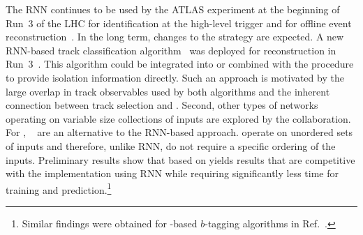 The RNN \tauid continues to be used by the ATLAS experiment at the beginning of
Run~3 of the LHC for identification at the high-level trigger and for offline
event reconstruction~\cite{ATL-PHYS-PUB-2022-044}. In the long term, changes to
the \tauid strategy are expected. A new RNN-based \tauhadvis track
classification algorithm~\cite{Maerker:2021hro} was deployed for \tauhadvis
reconstruction in Run~3~\cite{ATL-PHYS-PUB-2022-044}. This algorithm could be
integrated into or combined with the \tauid procedure to provide isolation
information directly. Such an approach is motivated by the large overlap in
track observables used by both algorithms and the inherent connection between
\tauhadvis track selection and \tauid. Second, other types of networks operating
on variable size collections of inputs are explored by the collaboration. For
\tauid, \deepsets~\cite{NIPS2017_f22e4747} are an alternative to the RNN-based
approach. \deepsets operate on unordered sets of inputs and therefore, unlike
RNN, do not require a specific ordering of the inputs. Preliminary results show
that \tauid based on \deepsets yields results that are competitive with the
implementation using RNN while requiring significantly less time for training
and prediction.\footnote{Similar findings were obtained for \deepsets-based
  $b$-tagging algorithms in Ref.~\cite{ATL-PHYS-PUB-2020-014}.}




